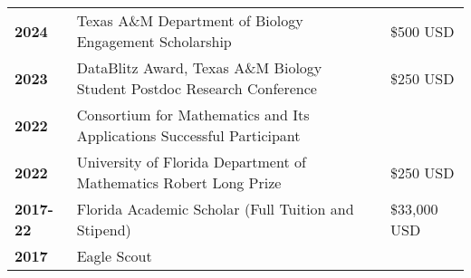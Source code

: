 \documentclass[11pt]{article}
\begin{document}
\section*{\color{secondary}{Awards}}
	\begin{longtable}{p{}p{}p{}}
		\textbf{2024} & Texas A\&M Department of Biology Engagement Scholarship & \$500 USD \\ 
		\textbf{2023} & DataBlitz Award, Texas A\&M Biology Student Postdoc Research Conference & \$250 USD \\ 
		\textbf{2022} & Consortium for Mathematics and Its Applications Successful Participant & \\
		\textbf{2022} & University of Florida Department of Mathematics Robert Long Prize & \$250 USD \\ 
		\textbf{2017-22} & {Florida Academic Scholar (Full Tuition and Stipend)} & \$33,000 USD \\ 
		\textbf{2017} & Eagle Scout & \\ 
	\end{longtable}
\end{document}
